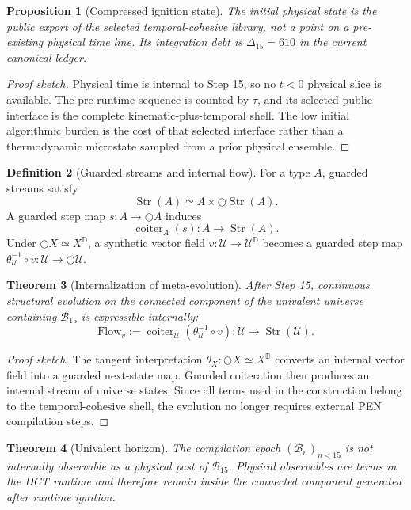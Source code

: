 \documentclass[11pt]{article}
\theoremstyle{plain}
\newtheorem{theorem}{Theorem}[section]
\newtheorem{proposition}[theorem]{Proposition}
\theoremstyle{definition}
\newtheorem{definition}[theorem]{Definition}
\theoremstyle{remark}
\newenvironment{proofsketch}{\begin{proof}[Proof sketch]}{\end{proof}}
\newcommand{\B}{\mathcal{B}}
\newcommand{\U}{\mathcal{U}}
\newcommand{\Str}{\operatorname{Str}}
\newcommand{\coiter}{\operatorname{coiter}}
\newcommand{\Next}{\bigcirc}
\newcommand{\D}{\mathbb{D}}
\begin{document}
\begin{proposition}[Compressed ignition state]
The initial physical state is the public export of the selected temporal-cohesive library, not a point on a pre-existing physical time line. Its integration debt is \(\Delta_{15}=610\) in the current canonical ledger.
\end{proposition}

\begin{proofsketch}
Physical time is internal to Step 15, so no \(t<0\) physical slice is available. The pre-runtime sequence is counted by \(\tau\), and its selected public interface is the complete kinematic-plus-temporal shell. The low initial algorithmic burden is the cost of that selected interface rather than a thermodynamic microstate sampled from a prior physical ensemble.
\end{proofsketch}

\begin{definition}[Guarded streams and internal flow]
For a type \(A\), guarded streams satisfy
\[
\Str(A)\simeq A\times \Next\Str(A).
\]
A guarded step map \(s:A\to\Next A\) induces
\[
\coiter_A(s):A\to\Str(A).
\]
Under \(\Next X\simeq X^{\D}\), a synthetic vector field \(v:\U\to\U^{\D}\) becomes a guarded step map \(\theta_\U^{-1}\circ v:\U\to\Next\U\).
\end{definition}

\begin{theorem}[Internalization of meta-evolution]
After Step 15, continuous structural evolution on the connected component of the univalent universe containing \(\B_{15}\) is expressible internally:
\[
\mathrm{Flow}_v
:=
\coiter_\U(\theta_\U^{-1}\circ v):\U\to\Str(\U).
\]
\end{theorem}

\begin{proofsketch}
The tangent interpretation \(\theta_X:\Next X\simeq X^{\D}\) converts an internal vector field into a guarded next-state map. Guarded coiteration then produces an internal stream of universe states. Since all terms used in the construction belong to the temporal-cohesive shell, the evolution no longer requires external PEN compilation steps.
\end{proofsketch}

\begin{theorem}[Univalent horizon]
The compilation epoch \((\B_n)_{n<15}\) is not internally observable as a physical past of \(\B_{15}\). Physical observables are terms in the DCT runtime and therefore remain inside the connected component generated after runtime ignition.
\end{theorem}
\end{document}
